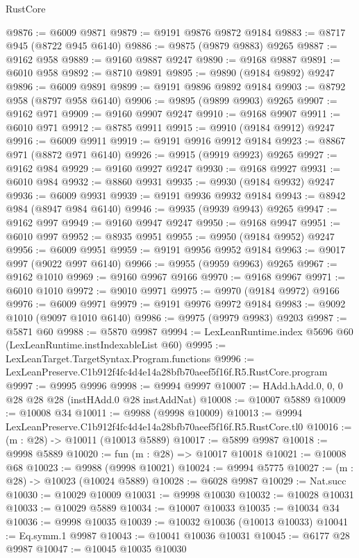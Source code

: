 \begin{lexlean}{RustCore}
\begin{coremodule}
@9876 := @6009 @9871
@9879 := @9191 @9876 @9872 @9184
@9883 := @8717 @945 (@8722 @945 @6140)
@9886 := @9875 (@9879 @9883) @9265
@9887 := @9162 @958
@9889 := @9160 @9887 @9247
@9890 := @9168 @9887
@9891 := @6010 @958
@9892 := @8710 @9891
@9895 := @9890 (@9184 @9892) @9247
@9896 := @6009 @9891
@9899 := @9191 @9896 @9892 @9184
@9903 := @8792 @958 (@8797 @958 @6140)
@9906 := @9895 (@9899 @9903) @9265
@9907 := @9162 @971
@9909 := @9160 @9907 @9247
@9910 := @9168 @9907
@9911 := @6010 @971
@9912 := @8785 @9911
@9915 := @9910 (@9184 @9912) @9247
@9916 := @6009 @9911
@9919 := @9191 @9916 @9912 @9184
@9923 := @8867 @971 (@8872 @971 @6140)
@9926 := @9915 (@9919 @9923) @9265
@9927 := @9162 @984
@9929 := @9160 @9927 @9247
@9930 := @9168 @9927
@9931 := @6010 @984
@9932 := @8860 @9931
@9935 := @9930 (@9184 @9932) @9247
@9936 := @6009 @9931
@9939 := @9191 @9936 @9932 @9184
@9943 := @8942 @984 (@8947 @984 @6140)
@9946 := @9935 (@9939 @9943) @9265
@9947 := @9162 @997
@9949 := @9160 @9947 @9247
@9950 := @9168 @9947
@9951 := @6010 @997
@9952 := @8935 @9951
@9955 := @9950 (@9184 @9952) @9247
@9956 := @6009 @9951
@9959 := @9191 @9956 @9952 @9184
@9963 := @9017 @997 (@9022 @997 @6140)
@9966 := @9955 (@9959 @9963) @9265
@9967 := @9162 @1010
@9969 := @9160 @9967 @9166
@9970 := @9168 @9967
@9971 := @6010 @1010
@9972 := @9010 @9971
@9975 := @9970 (@9184 @9972) @9166
@9976 := @6009 @9971
@9979 := @9191 @9976 @9972 @9184
@9983 := @9092 @1010 (@9097 @1010 @6140)
@9986 := @9975 (@9979 @9983) @9203
@9987 := @5871 @60
@9988 := @5870 @9987
@9994 := LexLeanRuntime.index @5696 @60 (LexLeanRuntime.instIndexableList @60)
@9995 := LexLeanTarget.TargetSyntax.Program.functions
@9996 := LexLeanPreserve.C1b912f4fc4d4e14a28bfb70aeef5f16f.R5.RustCore.program
@9997 := @9995 @9996
@9998 := @9994 @9997
@10007 := HAdd.hAdd.{0, 0, 0} @28 @28 @28 (instHAdd.{0} @28 instAddNat)
@10008 := @10007 @5889
@10009 := @10008 @34
@10011 := @9988 (@9998 @10009)
@10013 := @9994 LexLeanPreserve.C1b912f4fc4d4e14a28bfb70aeef5f16f.R5.RustCore.tl0
@10016 := (m : @28) -> @10011 (@10013 @5889)
@10017 := @5899 @9987
@10018 := @9998 @5889
@10020 := fun (m : @28) => @10017 @10018
@10021 := @10008 @68
@10023 := @9988 (@9998 @10021)
@10024 := @9994 @5775
@10027 := (m : @28) -> @10023 (@10024 @5889)
@10028 := @6028 @9987
@10029 := Nat.succ
@10030 := @10029 @10009
@10031 := @9998 @10030
@10032 := @10028 @10031
@10033 := @10029 @5889
@10034 := @10007 @10033
@10035 := @10034 @34
@10036 := @9998 @10035
@10039 := @10032 @10036 (@10013 @10033)
@10041 := Eq.symm.{1} @9987
@10043 := @10041 @10036 @10031
@10045 := @6177 @28 @9987
@10047 := @10045 @10035 @10030

\end{coremodule}
\end{lexlean}
